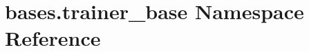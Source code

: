 \hypertarget{namespacebases_1_1trainer__base}{}\section{bases.\+trainer\+\_\+base Namespace Reference}
\label{namespacebases_1_1trainer__base}
